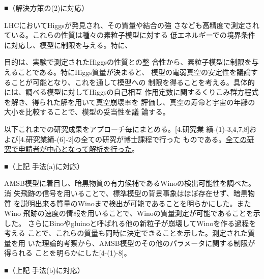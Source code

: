 \documentclass[11pt,a4paper,twoside,dvipdfmx]{jarticle}		%
\newcommand{\研究課題名}{粒子加速器を用いた電弱相互作用を持つ新物理の探索}
\newcommand{\研究機関名}{東京大学}
\newcommand{\申請者氏名}{千草颯}
\newcommand{\研究代表者氏名}{\申請者氏名}
\newcommand{\研究期間の最終元号年度}{34}	%
\begin{document}
{\vspace*{1mm}

■（解決方策の(2)に対応）

\vspace*{1mm}

LHCにおいてHiggsが発見され、その質量や結合の強
さなども高精度で測定されている。これらの性質は種々の素粒子模型に対する
低エネルギーでの境界条件に対応し、模型に制限を与える。特に、

目的は、実験で測定されたHiggsの性質との整
合性から、素粒子模型に制限を与えることである。特にHiggs質量が決まると、
模型の電弱真空の安定性を議論することが可能となり、これを通して模型への
制限を得ることを考える。具体的には、調べる模型に対してHiggsの自己相互
作用定数に関するくりこみ群方程式を解き、得られた解を用いて真空崩壊率を
評価し、真空の寿命と宇宙の年齢の大小を比較することで、模型の妥当性を議
論する。

\vspace*{1mm}


\vspace*{1mm}

以下これまでの研究成果をアプローチ毎にまとめる。[4.研究業
績-(1)-3,4,7,8]および[4.研究業績-(6)-2]の全ての研究が博士課程で行った
ものである。\ul{全ての研究で申請者が中心となって解析を行った}。

\vspace*{1mm}

■（上記  手法(a)に対応）

\vspace*{1mm}

AMSB模型に着目し、暗黒物質の有力候補であるWinoの検出可能性を調べた。消
失飛跡の信号を用いることで、標準模型の背景事象はほぼ存在せず、暗黒物質
を説明出来る質量のWinoまで検出が可能であることを明らかにした。またWino
飛跡の速度の情報を用いることで、Winoの質量測定が可能であることを示した。
さらにBinoやgluinoと呼ばれる他の新粒子が崩壊してWinoを作る過程を考える
ことで、これらの質量も同時に決定できることを示した。測定された質量を用
いた理論的考察から、AMSB模型のその他のパラメータに関する制限が得られる
ことを明らかにした[4-(1)-8]。

\vspace*{1mm}

■（上記  手法(b)に対応）

}
\end{document}
